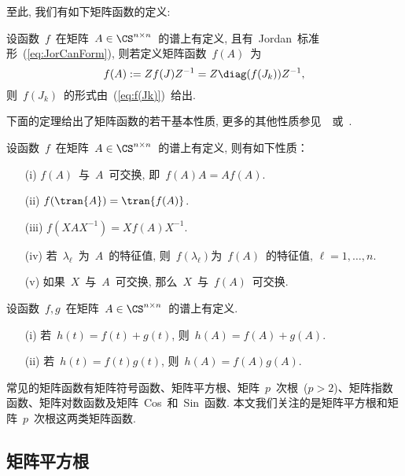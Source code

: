 至此, 我们有如下矩阵函数的定义:

\begin{definition}
\label{def:MatFun} 设函数~$f$~在矩阵~$A \in \CS^{n\times
n}$~的谱上有定义, 且有~Jordan~标准形~(\ref{eq:JorCanForm}),
则若定义矩阵函数~$f(A)$~为
\begin{equation}
\label{eq:MatFun} f(A) := Zf(J)Z^{-1} = Z\diag(f(J_k))Z^{-1},
\end{equation}
则~$f(J_k)$~的形式由~(\ref{eq:f(Jk)})~给出.
\end{definition}

下面的定理给出了矩阵函数的若干基本性质,
更多的其他性质参见~\cite{Higham2008}~或~\cite{HornJohnson1991}.

\begin{theorem}
\label{th:MatFunProperty} 设函数~$f$~在矩阵~$A\in\CS^{n\times
n}$~的谱上有定义, 则有如下性质：
\begin{enumerate}
\item[\textup{(i)}]
$f(A)$~与~$A$~可交换, 即~$f(A)A = Af(A)$.
\item[\textup{(ii)}]
$f(\tran{A})= \tran{f(A)}$.
\item[\textup{(iii)}]
$f(XAX^{-1}) = Xf(A)X^{-1}$.
\item[\textup{(iv)}]
若~$\lambda_\ell$~为~$A$~的特征值,
则~$f(\lambda_\ell)$为~$f(A)$~的特征值,  $\ell = 1,\ldots,n$.
\item[\textup{(v)}]
如果~$X$~与~$A$~可交换, 那么~$X$~与~$f(A)$~可交换.
\end{enumerate}
\end{theorem}


\begin{theorem}
\label{th:MatFun_sum_product} 设函数~$f,g$~在矩阵~$A\in\CS^{n\times
n}$~的谱上有定义.
\begin{enumerate}
\item[\textup{(i)}]
若~$h(t) = f(t) + g(t)$, 则~$h(A) = f(A)+g(A)$.
\item[\textup{(ii)}]
若~$h(t)=f(t)g(t)$, 则~$h(A)=f(A)g(A)$.
\end{enumerate}
\end{theorem}


常见的矩阵函数有矩阵符号函数、矩阵平方根、矩阵~$p$~次根~($p >
2$)、矩阵指数函数、矩阵对数函数及矩阵~Cos~和~Sin~函数.
本文我们关注的是矩阵平方根和矩阵~$p$~次根这两类矩阵函数.



\subsection{矩阵平方根}

